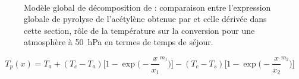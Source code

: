 \begin{figure}[!h]
	\centering
	\\
	
	\caption{Modèle global de décomposition de : \protect{} comparaison entre l'expression globale de pyrolyse de l'acétylène obtenue par \citet{Norinaga2005} et celle dérivée dans cette section, \protect{} rôle de la température sur la conversion pour une atmosphère  à \SI{50}{\hecto\pascal} en termes de temps de séjour.}
\end{figure}

\begin{equation}
  T_{p}(x)=T_{a}+
  (T_{c}-T_{a}){}\biggr[1-\exp\biggr(-\frac{x}{x_{1}}^{m_{1}}\biggr)\biggr]-
  (T_{c}-T_{s}){}\biggr[1-\exp\biggr(-\frac{x}{x_{2}}^{m_{2}}\biggr)\biggr]
  \label{eq:wall-temperature}
\end{equation}

